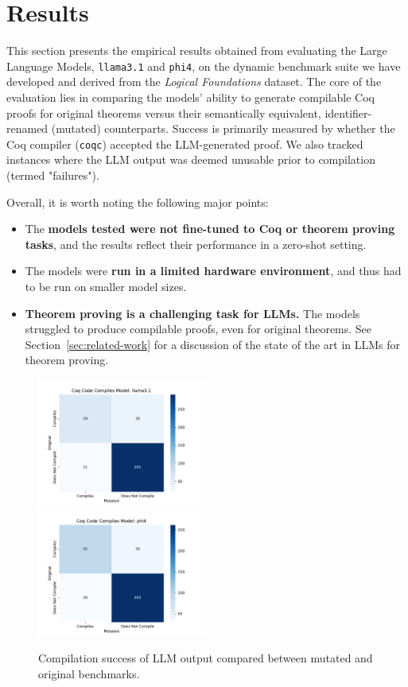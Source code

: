 \section{Results}
\label{sec:results}

This section presents the empirical results obtained from evaluating the Large Language Models, \texttt{llama3.1} and \texttt{phi4}, on the dynamic benchmark suite we have developed and derived from the \emph{Logical Foundations} dataset. 
The core of the evaluation lies in comparing the models' ability to generate compilable Coq proofs for original theorems versus their semantically equivalent, identifier-renamed (mutated) counterparts. 
Success is primarily measured by whether the Coq compiler (\texttt{coqc}) accepted the LLM-generated proof. 
We also tracked instances where the LLM output was deemed unusable prior to compilation (termed "failures").

\noindent Overall, it is worth noting the following major points:
\begin{itemize}
  \item The \textbf{models tested were not fine-tuned to Coq or theorem proving tasks}, and the results reflect their performance in a zero-shot setting.
  \item The models were \textbf{run in a limited hardware environment}, and thus had to be run on smaller model sizes.
  \item \textbf{Theorem proving is a challenging task for LLMs.} The models struggled to produce compilable proofs, even for original theorems. See Section~\ref{sec:related-work} for a discussion of the state of the art in LLMs for theorem proving.
\end{itemize}

\begin{figure}
\includegraphics[width=0.50\textwidth]{CM_Compiles_Model_llama3.1}
\includegraphics[width=0.50\textwidth]{CM_Compiles_Model_phi4}
\caption{Compilation success of LLM output compared between mutated and original benchmarks.}
\label{fig:confusion_matrix}
\end{figure}

